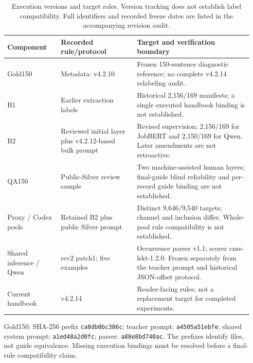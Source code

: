 \begin{table}[!htbp]
\centering\small
\caption{Execution versions and target roles. Version tracking does not establish label compatibility. Full identifiers and recorded freeze dates are listed in the accompanying revision audit.}
\label{tab:execution-version-matrix}
\begin{tabularx}{\linewidth}{@{}P{.18\linewidth}P{.26\linewidth}L@{}}
\toprule
Component & Recorded rule/protocol & Target and verification boundary \\
\midrule
Gold150 & Metadata: v4.2.10 & Frozen 150-sentence diagnostic reference; no complete v4.2.14 relabeling audit. \\
B1 & Earlier extraction labels & Historical 2,156/169 manifests; a single executed handbook binding is not established. \\
B2 & Reviewed initial layer plus v4.2.12-based bulk prompt & Revised supervision; 2,156/169 for JobBERT and 2,150/169 for Qwen. Later amendments are not retroactive. \\
QA150 & Public-Silver review sample & Two machine-assisted human layers; final-guide blind reliability and per-record guide binding are not established. \\
Proxy / Codex pools & Retained B2 plus public Silver prompt & Distinct 9,646/9,540 targets; channel and inclusion differ. Whole-pool rule compatibility is not established. \\
Shared inference / Qwen & rev2 patch1; five examples & Occurrence parser v1.1; scorer cnss-lskt-1.2.0. Frozen separately from the teacher prompt and historical JSON-offset protocol. \\
Current handbook & v4.2.14 & Reader-facing rules; not a replacement target for completed experiments. \\
\bottomrule
\end{tabularx}
\par\smallskip\footnotesize\RaggedRight
Gold150: SHA-256 prefix \texttt{ca8db0bc386c}; teacher prompt: \texttt{a4505a51ebfe}; shared system prompt: \texttt{a1ed48a2d0fc}; parser: \texttt{a88e8bd740ac}. The prefixes identify files, not guide equivalence. Missing execution bindings must be resolved before a final-rule compatibility claim.
\end{table}
